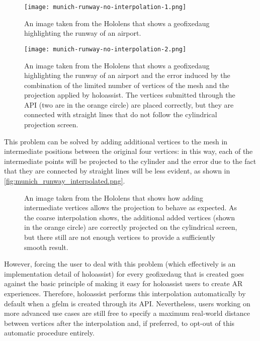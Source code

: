 \begin{figure}
  \centering
  \texttt{[image: munich-runway-no-interpolation-1.png]}
  \caption{An image taken from the Hololens that shows a \gls{geofixedaug} highlighting the runway of an airport.}\label{fig:munich_runway_highlighted.png}
\end{figure}

\begin{figure}
  \centering
  \texttt{[image: munich-runway-no-interpolation-2.png]}
  \caption{An image taken from the Hololens that shows a \gls{geofixedaug} highlighting the runway of an airport and the error induced by the combination of the limited number of vertices of the mesh and the projection applied by \gls{holoassist}. The vertices submitted through the \gls{API} (two are in the orange circle) are placed correctly, but they are connected with straight lines that do not follow the cylindrical projection screen.}\label{fig:munigh_runway_highligted_projection_not_interpolated.png}
\end{figure}

This problem can be solved by adding additional vertices to the mesh in intermediate positions between the original four vertices: in this way, each of the intermediate points will be projected to the cylinder and the error due to the fact that they are connected by straight lines will be less evident, as shown in \autoref{fig:munich_runway_interpolated.png}.

\begin{figure}
  \centering
  \hfill
  \caption{An image taken from the Hololens that shows how adding intermediate vertices allows the projection to behave as expected. As the coarse interpolation shows, the additional added vertices (shown in the orange circle) are correctly projected on the cylindrical screen, but there still are not enough vertices to provide a sufficiently smooth result.}
\label{fig:munich_runway_interpolated.png}
\end{figure}

However, forcing the user to deal with this problem (which effectively is an implementation detail of \gls{holoassist}) for every \gls{geofixedaug} that is created goes against the basic principle of making it easy for \gls{holoassist} users to create \gls{AR} experiences. Therefore, \gls{holoassist} performs this interpolation automatically by default when a \gls{gfelm} is created through its \gls{API}. Nevertheless, users working on more advanced use cases are still free to specify a maximum real-world distance between vertices after the interpolation and, if preferred, to opt-out of this automatic procedure entirely.

